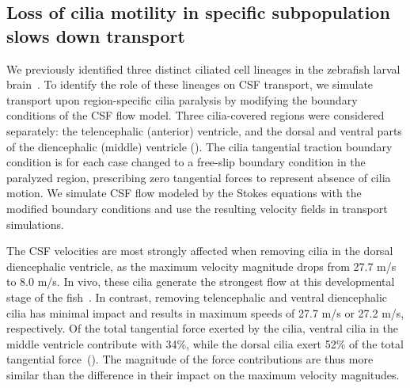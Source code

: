 \documentclass{WileyMSP-template}
\begin{document}
\subsection{Loss of cilia motility in specific subpopulation slows down transport}
We previously identified three distinct ciliated cell lineages in the
zebrafish larval brain~\cite{Olstad2019CiliaryDevelopment, DGama2025MotileBrain}.
To identify the role of these lineages on CSF transport, we simulate transport
upon region-specific cilia paralysis by modifying the boundary conditions
of the CSF flow model. Three cilia-covered regions were considered separately:
the telencephalic (anterior) ventricle, and the dorsal and ventral parts
of the diencephalic (middle) ventricle ().
The cilia tangential traction boundary condition is for each case
changed to a free-slip boundary condition in the paralyzed region,
prescribing zero tangential forces to
represent absence of cilia motion.
We simulate CSF flow modeled by the Stokes equations with the
modified boundary conditions and use the resulting
velocity fields in transport simulations.

The CSF velocities are most strongly
affected when removing cilia in the dorsal diencephalic ventricle,
as the maximum velocity magnitude drops from 27.7 \textmu m/s to 8.0 \textmu m/s.
In vivo, these cilia generate the strongest flow at
this developmental stage of the fish~\cite{Olstad2019CiliaryDevelopment}.
In contrast, removing telencephalic and ventral diencephalic cilia has minimal
impact and results in maximum speeds of 27.7 \textmu m/s or 27.2 \textmu m/s, respectively.
Of the total tangential force exerted by the cilia, ventral cilia in the middle ventricle
contribute with 34\%, while the dorsal cilia exert 52\% of the total tangential
force~(). The magnitude of the force contributions are thus
more similar than the difference in their impact on the maximum velocity magnitudes.
\end{document}
